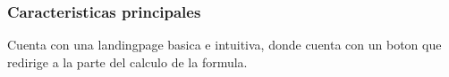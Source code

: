 \begin{frame}
\frametitle{Caracteristicas principales} 
Cuenta con una landingpage basica e intuitiva, donde cuenta con un boton que redirige a la parte del calculo de la formula.
\tableofcontents 
\end{frame}